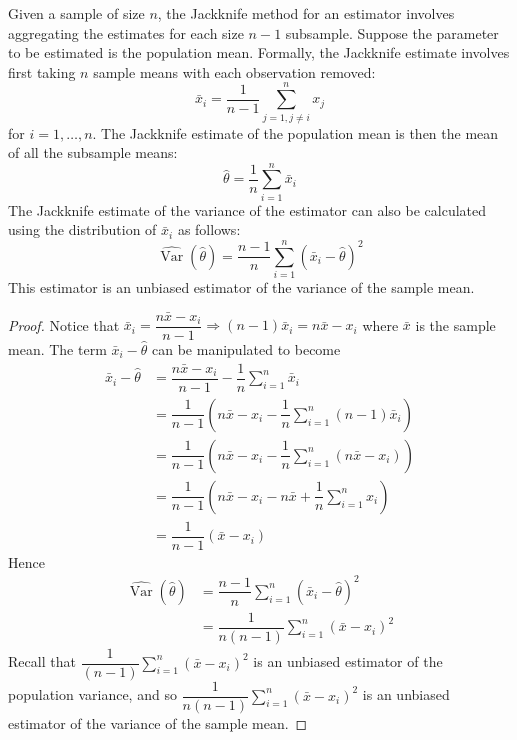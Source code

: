 \documentclass[11pt]{report} %
\begin{document}
Given a sample of size $n$, the Jackknife method for an estimator involves aggregating the estimates for each size $n - 1$ subsample. Suppose the parameter to be estimated is the population mean. Formally, the Jackknife estimate involves first taking $n$ sample means with each observation removed:
\begin{equation}
\bar{x}_{i} = \dfrac{1}{n - 1}\sum_{j = 1, j\neq i}^{n}x_{j}
\end{equation}
for $i = 1, \dots, n$. The Jackknife estimate of the population mean is then the mean of all the subsample means:
\begin{equation}
\hat{\theta} = \dfrac{1}{n}\sum_{i = 1}^{n}\bar{x}_{i}
\end{equation}
The Jackknife estimate of the variance of the estimator can also be calculated using the distribution of $\bar{x}_{i}$ as follows:
\begin{equation}
\hat{\operatorname{Var}}\left(\hat{\theta}\right) = \dfrac{n - 1}{n}\sum_{i = 1}^{n}\left(\bar{x}_{i} - \hat{\theta}\right)^{2}
\end{equation}
This estimator is an unbiased estimator of the variance of the sample mean.
\begin{proof}
Notice that $\bar{x}_{i} = \dfrac{n\bar{x} - x_{i}}{n - 1} \Rightarrow \left(n - 1\right)\bar{x}_{i} = n\bar{x} - x_{i}$ where $\bar{x}$ is the sample mean. The term $\bar{x}_{i} - \hat{\theta}$ can be manipulated to become
\begin{align}
\bar{x}_{i} - \hat{\theta} &= \dfrac{n\bar{x} - x_{i}}{n - 1} - \dfrac{1}{n}\sum_{i = 1}^{n}\bar{x}_{i} \\
&= \dfrac{1}{n - 1}\left(n\bar{x} - x_{i} - \dfrac{1}{n}\sum_{i = 1}^{n}\left(n - 1\right)\bar{x}_{i}\right) \\
&= \dfrac{1}{n - 1}\left(n\bar{x} - x_{i} - \dfrac{1}{n}\sum_{i = 1}^{n}\left(n\bar{x} - x_{i}\right)\right) \\
&= \dfrac{1}{n - 1}\left(n\bar{x} - x_{i} - n\bar{x} + \dfrac{1}{n}\sum_{i = 1}^{n}x_{i}\right) \\
&= \dfrac{1}{n - 1}\left(\bar{x} - x_{i}\right)
\end{align}
Hence
\begin{align}
\hat{\operatorname{Var}}\left(\hat{\theta}\right) &= \dfrac{n - 1}{n}\sum_{i = 1}^{n}\left(\bar{x}_{i} - \hat{\theta}\right)^{2} \\
&= \dfrac{1}{n\left(n - 1\right)}\sum_{i = 1}^{n}\left(\bar{x} - x_{i}\right)^{2}
\end{align}
Recall that $\dfrac{1}{\left(n - 1\right)}\sum_{i = 1}^{n}\left(\bar{x} - x_{i}\right)^{2}$ is an unbiased estimator of the population variance, and so $\dfrac{1}{n\left(n - 1\right)}\sum_{i = 1}^{n}\left(\bar{x} - x_{i}\right)^{2}$ is an unbiased estimator of the variance of the sample mean.
\end{proof}
\end{document}
